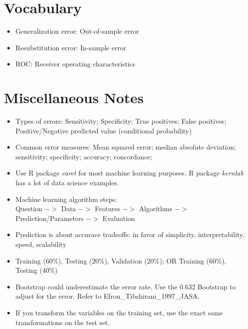 \documentclass[11pt]{extarticle} %
\begin{document}
\section{Vocabulary}
\begin{itemize}
\item Generalization error: Out-of-sample error
\item Resubstitution error: In-sample error
\item ROC: Receiver operating characteristics
\end{itemize}

\section{Miscellaneous Notes}
\begin{itemize}
\item Types of errors: Sensitivity; Specificity; True positives; False positives; Positive/Negative predicted value (conditional probability)
\item Common error measures: Mean squared error; median absolute deviation; sensitivity; specificity; accuracy; concordance;
\item Use R package {\emph{caret}} for most machine learning purposes. R package {\emph{kernlab}} has a lot of data science examples. 
\item Machine learning algorithm steps: \\ Question $->$ Data $->$ Features $->$ Algorithms $->$ Prediction/Parameters $->$ Evaluation
\item Prediction is about accurace tradeoffs: in favor of simplicity, interpretability, speed, scalability
\item Training (60\%), Testing (20\%), Validation (20\%); OR Training (60\%), Testing (40\%)
\item Bootstrap could underestimate the error rate. Use the 0.632 Bootstrap to adjust for the error. Refer to Efron\_Tibshirani\_1997\_JASA.
\item If you transform the variables on the training set, use the exact same transformations on the test set.
\end{itemize}
\end{document}
